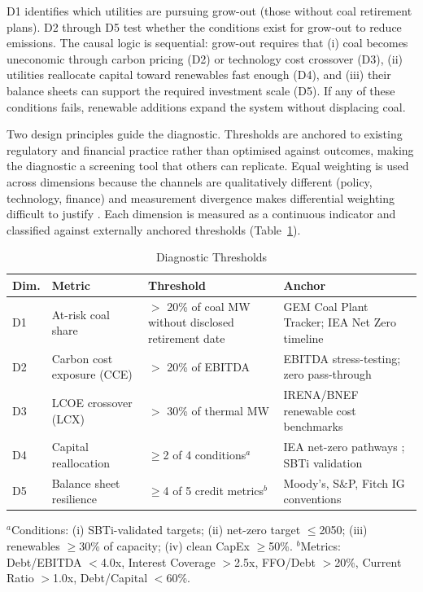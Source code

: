 \documentclass[review,3p,authoryear]{elsarticle}
\begin{document}
D1 identifies which utilities are pursuing grow-out (those without coal retirement plans). D2 through D5 test whether the conditions exist for grow-out to reduce emissions. The causal logic is sequential: grow-out requires that (i) coal becomes uneconomic through carbon pricing (D2) or technology cost crossover (D3), (ii) utilities reallocate capital toward renewables fast enough (D4), and (iii) their balance sheets can support the required investment scale (D5). If any of these conditions fails, renewable additions expand the system without displacing coal.

Two design principles guide the diagnostic. Thresholds are anchored to existing regulatory and financial practice \citep{EUTaxonomy2021} rather than optimised against outcomes, making the diagnostic a screening tool that others can replicate. Equal weighting is used across dimensions because the channels are qualitatively different (policy, technology, finance) and measurement divergence makes differential weighting difficult to justify \citep{Berg2022}. Each dimension is measured as a continuous indicator and classified against externally anchored thresholds (Table~\ref{tab:thresholds}).

\begin{table}[H]
\centering
\caption{Diagnostic Thresholds}
\label{tab:thresholds}
{\footnotesize\linespread{1.0}\selectfont
\begin{tabular}{@{}p{}p{}p{}p{}@{}}
\toprule
\textbf{Dim.} & \textbf{Metric} & \textbf{Threshold} & \textbf{Anchor} \\
\midrule
D1 & At-risk coal share & $>$ 20\% of coal MW without disclosed retirement date & GEM Coal Plant Tracker; IEA Net Zero timeline \citep{IEA2024Coal} \\
D2 & Carbon cost exposure (CCE) & $>$ 20\% of EBITDA & EBITDA stress-testing; zero pass-through \citep{Sijm2006} \\
D3 & LCOE crossover (LCX) & $>$ 30\% of thermal MW & IRENA/BNEF renewable cost benchmarks \citep{IRENA2025} \\
D4 & Capital reallocation & $\geq$2 of 4 conditions$^{a}$ & IEA net-zero pathways \citep{IEA2023}; SBTi validation \\
D5 & Balance sheet resilience & $\geq$4 of 5 credit metrics$^{b}$ & Moody's, S\&P, Fitch IG conventions \citep{Moodys2024,SPRatings2024,Fitch2024} \\
\bottomrule
\end{tabular}
}
\begin{flushleft}
\footnotesize{$^{a}$Conditions: (i) SBTi-validated targets; (ii) net-zero target $\leq$2050; (iii) renewables $\geq$30\% of capacity; (iv) clean CapEx $\geq$50\%. $^{b}$Metrics: Debt/EBITDA $<$4.0x, Interest Coverage $>$2.5x, FFO/Debt $>$20\%, Current Ratio $>$1.0x, Debt/Capital $<$60\%.}
\end{flushleft}
\end{table}
\end{document}
